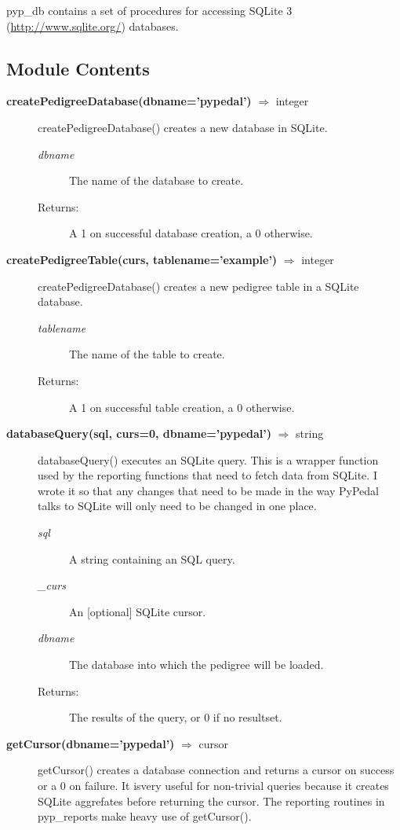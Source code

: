 pyp\_db contains a set of procedures for accessing SQLite 3 (\url{http://www.sqlite.org/}) databases.
\label{sec:pyp-db}
\subsection*{Module Contents}
\begin{description}
\item[\textbf{createPedigreeDatabase(dbname='pypedal')} $\Rightarrow$ integer]
createPedigreeDatabase() creates a new database in SQLite.
\begin{description}
\item[\emph{dbname}] The name of the database to create.
\item[Returns:] A 1 on successful database creation, a 0 otherwise.
\end{description}
\item[\textbf{createPedigreeTable(curs, tablename='example')} $\Rightarrow$ integer]
createPedigreeDatabase() creates a new pedigree table in a SQLite database.
\begin{description}
\item[\emph{tablename}] The name of the table to create.
\item[Returns:] A 1 on successful table creation, a 0 otherwise.
\end{description}
\item[\textbf{databaseQuery(sql, curs=0, dbname='pypedal')} $\Rightarrow$ string]
databaseQuery() executes an SQLite query. This is a wrapper function used by the reporting functions that need to fetch data from SQLite. I wrote it so that any changes that need to be made in the way PyPedal talks to SQLite will only need to be changed in one place.
\begin{description}
\item[\emph{sql}] A string containing an SQL query.
\item[\emph{\_curs}] An [optional] SQLite cursor.
\item[\emph{dbname}] The database into which the pedigree will be loaded.
\item[Returns:] The results of the query, or 0 if no resultset.
\end{description}
\item[\textbf{getCursor(dbname='pypedal')} $\Rightarrow$ cursor]
getCursor() creates a database connection and returns a cursor on success or a 0 on failure. It isvery useful for non-trivial queries because it creates SQLite aggrefates before returning the cursor. The reporting routines in pyp\_reports make heavy use of getCursor().

\end{description}
